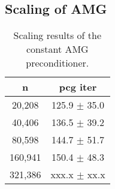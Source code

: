\documentclass{article}
\begin{document}
\subsection{Scaling of AMG}

\begin{table}[ht]
	\caption{Scaling results of the constant AMG preconditioner.}
	\centering
	\begin{tabular}{|c|c|}
		\hline
		n & pcg iter \\
		\hline
		20,208  & 125.9 $\pm$ 35.0 \\
		40,406  & 136.5 $\pm$ 39.2  \\
		80,598  & 144.7 $\pm$ 51.7  \\
		160,941 & 150.4 $\pm$ 48.3  \\
		321,386 & xxx.x $\pm$ xx.x  \\
		\hline
	\end{tabular}
	\label{Tab:020}
\end{table}




\end{document}

